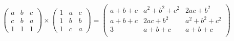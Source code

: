 {{$$\left( \begin{array}{ccc} a &b& c \\ c & b & a \\ 1 & 1 & 1\end{array} \right)
\times
 \left( \begin{array}{ccc} 1 &a& c \\ 1 & b & b \\ 1 & c & a\end{array} \right) 
 = \begin{pmatrix}
    a + b + c & a^2+b^2+c^2 & 2ac + b^2 \\
    a + b + c & 2ac + b^2   & a^2+b^2+c^2 \\
    3         &  a+b+c      & a+b+c \\
\end{pmatrix}$$
}
}
